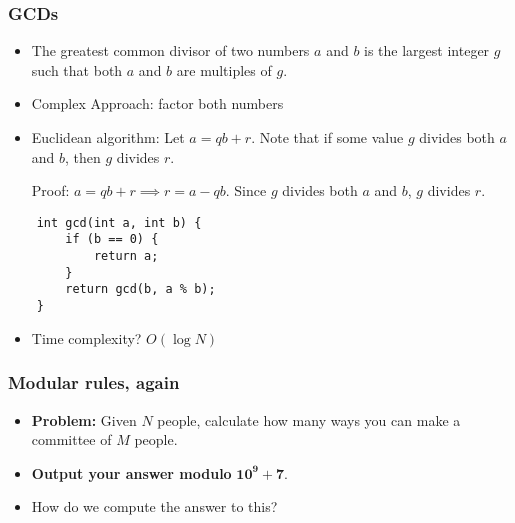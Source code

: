 \documentclass[t, handout]{beamer}
\begin{document}
\begin{frame}[fragile]

    \frametitle{GCDs}
    
    \begin{itemize}
        \item The greatest common divisor of two numbers $a$ and $b$ is the largest integer $g$ such that both $a$ and $b$ are multiples of $g$.
        
        \pause

        \item Complex Approach: factor both numbers
        
        \pause
        
        \item Euclidean algorithm: Let $a = q b + r$. Note that if some value $g$ divides both $a$ and $b$, then $g$ divides $r$.
        
        \pause

        Proof: $a = q b + r \implies r = a - qb$. Since $g$ divides both $a$ and $b$, $g$ divides $r$.
    \end{itemize}
    
    \pause
    \begin{verbatim}
    int gcd(int a, int b) {
        if (b == 0) {
            return a;
        }
        return gcd(b, a % b);
    }
    \end{verbatim}
    
    \pause
    \begin{itemize}
        \item Time complexity? \pause $O(\log N)$
    \end{itemize}
\end{frame}

\begin{frame}[fragile]
    
    \frametitle{Modular rules, again}
    
    \begin{itemize}
        \item \textbf{Problem:} Given $N$ people, calculate how many ways you can make a committee of $M$ people.
        \pause
        \item \textbf{Output your answer modulo} $\mathbf{10^9 + 7}$.
        \pause
        \item How do we compute the answer to this?
    \end{itemize}

\end{frame}
\end{document}

